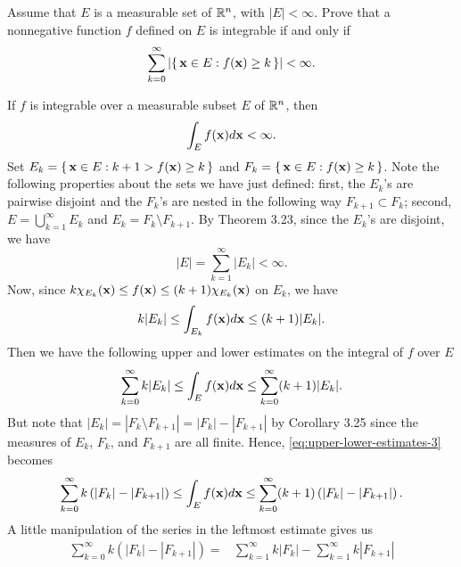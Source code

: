 \begin{problem}
Assume that $E$ is a measurable set of $\mathbb{R}^n$, with
$|E|<\infty$. Prove that a nonnegative function $f$ defined
on $E$ is integrable if and only if
\[
\sum_{k=0}^\infty\left|\left\{\,\mathbf{x}\in E:f(\mathbf{x})\geq
    k\,\right\}\right|<\infty.
\]
\end{problem}
\begin{solution}
If $f$ is integrable over a measurable subset $E$ of $\mathbb{R}^n$, then
\begin{equation}
\label{eq:integrability-3}
\int_E f(\mathbf{x}) d \mathbf{x}<\infty.
\end{equation}
Set $E_k=\left\{\,\mathbf{x}\in E:k+1>f(\mathbf{x})\geq k\,\right\}$ and
$F_k=\left\{\,\mathbf{x}\in E:f(\mathbf{x})\geq k\,\right\}$. Note the
following properties about the sets we have just defined: first, the
$E_k$'s are pairwise disjoint and the $F_k$'s are nested in the following
way $F_{k+1}\subset F_k$; second, $E=\bigcup_{k=1}^\infty E_k$ and
$E_k=F_k\setminus F_{k+1}$. By Theorem 3.23, since the $E_k$'s are disjoint,
we have
\begin{equation}
  \label{eq:disjoint-measurable-sets-3}
|E|=\sum_{k=1}^\infty|E_k|<\infty.
\end{equation}
Now, since $k\chi_{E_k}(\mathbf{x})\leq f(\mathbf{x})\leq (k+1)\chi_{E_k}(\mathbf{x})$ on
$E_k$, we have
\begin{equation}
\label{eq:estimates-E-k-3}
k|E_k|\leq\int_{E_k}f(\mathbf{x}) d \mathbf{x}\leq (k+1)|E_k|.
\end{equation}
Then we have the following upper and lower estimates on the integral of $f$
over $E$
\begin{equation}
\label{eq:upper-lower-estimates-3}
\sum_{k=0}^\infty k|E_k|\leq\int_E f(\mathbf{x}) d \mathbf{x}\leq\sum_{k=0}^\infty(k+1)|E_k|.
\end{equation}
But note that $|E_k|=|F_k\setminus F_{k+1}|=|F_k|-|F_{k+1}|$ by Corollary 3.25
since the measures of $E_k$, $F_k$, and $F_{k+1}$ are all finite. Hence,
\eqref{eq:upper-lower-estimates-3} becomes
\begin{equation}
\label{eq:new-upper-lower-estimates-3}
\sum_{k=0}^\infty k\left(|F_k|-|F_{k+1}|\right)\leq
\int_E f(\mathbf{x}) d \mathbf{x}\leq
\sum_{k=0}^\infty (k+1)\left(|F_k|-|F_{k+1}|\right).
\end{equation}
A little manipulation of the series in the leftmost estimate gives us
\begin{equation}
\label{eq:leftmost-estimate-3}
\begin{aligned}
\sum_{k=0}^\infty k\left(|F_k|-|F_{k+1}|\right)
={}&\sum_{k=1}^\infty k|F_k|-\sum_{k=1}^\infty k|F_{k+1}|\\

\end{aligned}
\end{equation}
\end{solution}
